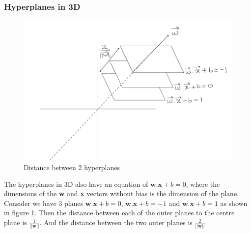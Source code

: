 \documentclass[11pt]{article}
\begin{document}
\subsubsection{Hyperplanes in 3D}
\begin{figure}[h!]
    \centering
  \includegraphics[scale=0.7]{fig3.PNG}
  \caption{Distance between 2 hyperplanes}
  \label{fig:dplane}
\end{figure}
The hyperplanes in 3D also have an equation of $\mathbf{w}.\mathbf{x}+b=0$, where the dimensions of the \textbf{w} and \textbf{x} vectors without bias is the dimension of the plane. Consider we have 3 planes $\mathbf{w}.\mathbf{x}+b=0$, $\mathbf{w}.\mathbf{x}+b=-1$ and $\mathbf{w}.\mathbf{x}+b=1$ as shown in figure \ref{fig:dplane}. Then the distance between each of the outer planes to the centre plane is $\frac{1}{||\mathbf{w}||}$. And the distance between the two outer planes is $\frac{2}{||\mathbf{w}||}$
\end{document}
